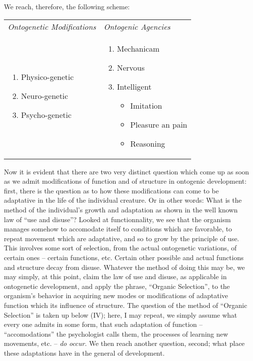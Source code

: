 \documentclass[11pt,twoside,a4paper]{article}
\begin{document}
We reach, therefore, the following scheme:~\\
\begin{tabular}{ p{5cm} p{5cm} }

\emph{Ontogenetic Modifications} & \emph{Ontogenic Agencies} \\

\begin{enumerate}
	\item Physico-genetic
	\item Neuro-genetic
	\item Psycho-genetic
\end{enumerate} & \begin{enumerate}
	\item Mechanicam
	\item Nervous
	\item Intelligent
	\begin{itemize}
		\item[] Imitation
		\item[] Pleasure an pain
		\item[] Reasoning
	\end{itemize}
\end{enumerate}
 \\
\end{tabular}


Now it is evident that there are two very distinct question which come up as soon as we admit modifications of function and of structure in ontogenic development: first, there is the question as to how these modifications can come to be adaptative in the life of the individual creature. Or in other words: What is the method of the individual's growth and adaptation as shown in the well known law of ``use and disuse''? Looked at functionnality, we see that the organism manages somehow to accomodate itself to conditions which are favorable, to repeat movement which are adaptative, and so to grow by the principle of use. This involves some sort of selection, from the actual ontogenetic variations, of certain ones -- certain functions, etc. Certain other possible and actual functions and structure decay from disuse. Whatever the method of doing this may be, we may simply, at this point, claim the law of use and disuse, as applicable in ontogenetic development, and apply the phrase, ``Organic Selection'', to the organism's behavior in acquiring new modes or modifications of adaptative function which its influence of structure. The question of the method of ``Organic Selection'' is taken up below (IV); here, I may repeat, we simply assume what every one admits in some form, that such adaptation of function -- ``accomodations'' the psychologist calls them, the processes of learning new movements, etc. -- \emph{do occur. } We then reach another question, second; what place these adaptations have in the general of development.~\\
\end{document}
